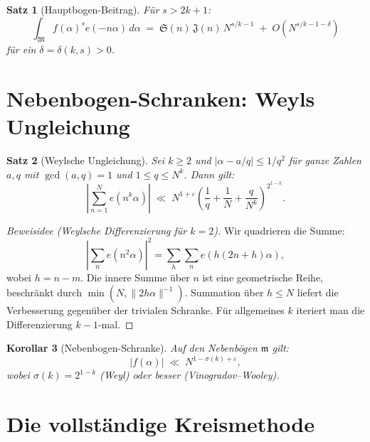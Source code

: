 \documentclass[12pt,a4paper]{amsart}
\newtheorem{theorem}{Satz}[section]
\newtheorem{korollar}[theorem]{Korollar}
\theoremstyle{definition}
\newcommand{\eq}[1]{e\!\left(#1\right)}
\begin{document}
\begin{theorem}[Hauptbogen-Beitrag]\label{thm:hauptbogen}
  Für $s > 2k+1$:
  \[
    \int_{\mathfrak{M}} f(\alpha)^s \eq{-n\alpha}\, d\alpha
    \;=\; \mathfrak{S}(n)\, \mathfrak{J}(n)\, N^{s/k - 1}
          \;+\; O\!\left(N^{s/k - 1 - \delta}\right)
  \]
  für ein $\delta = \delta(k, s) > 0$.
\end{theorem}

\section{Nebenbogen-Schranken: Weyls Ungleichung}
\label{sec:nebenbogen}

\begin{theorem}[Weylsche Ungleichung]\label{thm:weyl}
  Sei $k \geq 2$ und $|\alpha - a/q| \leq 1/q^2$ für ganze Zahlen
  $a, q$ mit $\gcd(a,q)=1$ und $1 \leq q \leq N^k$.  Dann gilt:
  \[
    \left|\sum_{n=1}^{N} \eq{n^k \alpha}\right|
    \;\ll\; N^{1+\varepsilon}
             \left(\frac{1}{q} + \frac{1}{N} + \frac{q}{N^k}\right)^{2^{1-k}}.
  \]
\end{theorem}

\begin{proof}[Beweisidee (Weylsche Differenzierung für $k=2$)]
  Wir quadrieren die Summe:
  \[
    \left|\sum_n \eq{n^2 \alpha}\right|^2
    = \sum_h \sum_n \eq{h(2n + h)\alpha},
  \]
  wobei $h = n - m$.  Die innere Summe über $n$ ist eine geometrische
  Reihe, beschränkt durch $\min(N, \|2h\alpha\|^{-1})$.  Summation
  über $h \leq N$ liefert die Verbesserung gegenüber der trivialen Schranke.
  Für allgemeines $k$ iteriert man die Differenzierung $k-1$-mal.
\end{proof}

\begin{korollar}[Nebenbogen-Schranke]\label{cor:nebenbogen}
  Auf den Nebenbögen $\mathfrak{m}$ gilt:
  \[
    |f(\alpha)| \;\ll\; N^{1 - \sigma(k) + \varepsilon},
  \]
  wobei $\sigma(k) = 2^{1-k}$ (Weyl) oder besser (Vinogradov--Wooley).
\end{korollar}

\section{Die vollständige Kreismethode}
\label{sec:vollstaendig}
\end{document}
